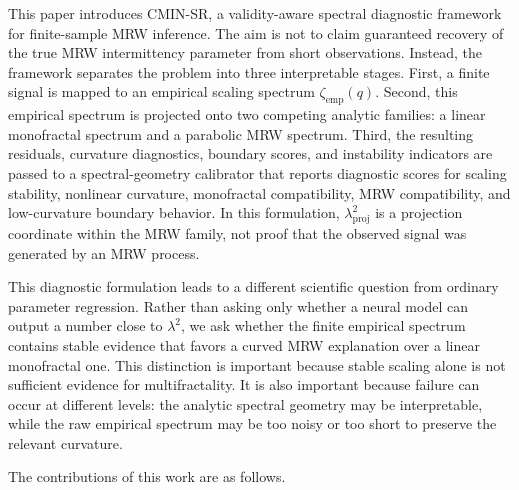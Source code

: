 This paper introduces CMIN-SR, a validity-aware spectral diagnostic framework
for finite-sample MRW inference. The aim is not to claim guaranteed recovery of
the true MRW intermittency parameter from short observations. Instead, the
framework separates the problem into three interpretable stages. First, a
finite signal is mapped to an empirical scaling spectrum
\(\zeta_{\mathrm{emp}}(q)\). Second, this empirical spectrum is projected onto
two competing analytic families: a linear monofractal spectrum and a parabolic
MRW spectrum. Third, the resulting residuals, curvature diagnostics, boundary
scores, and instability indicators are passed to a spectral-geometry
calibrator that reports diagnostic scores for scaling stability, nonlinear
curvature, monofractal compatibility, MRW compatibility, and low-curvature
boundary behavior. In this formulation, \(\lambda^2_{\mathrm{proj}}\) is a
projection coordinate within the MRW family, not proof that the observed signal
was generated by an MRW process.

This diagnostic formulation leads to a different scientific question from
ordinary parameter regression. Rather than asking only whether a neural model
can output a number close to \(\lambda^2\), we ask whether the finite empirical
spectrum contains stable evidence that favors a curved MRW explanation over a
linear monofractal one. This distinction is important because stable scaling
alone is not sufficient evidence for multifractality. It is also important
because failure can occur at different levels: the analytic spectral geometry
may be interpretable, while the raw empirical spectrum may be too noisy or too
short to preserve the relevant curvature.

The contributions of this work are as follows.

